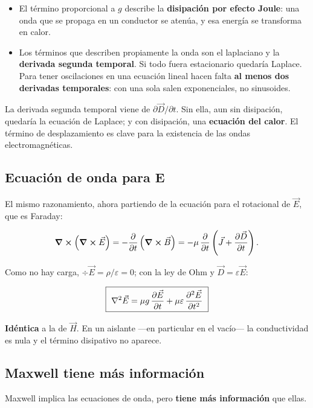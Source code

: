 \documentclass[12pt,a4paper]{article}
\begin{document}
\begin{itemize}
  \item El término proporcional a $g$ describe la \textbf{disipación por efecto Joule}: una
  onda que se propaga en un conductor se atenúa, y esa energía se transforma en
  calor.
  \item Los términos que describen propiamente la onda son el laplaciano y la
  \textbf{derivada segunda temporal}. Si todo fuera estacionario quedaría Laplace.
  Para tener oscilaciones en una ecuación lineal hacen falta \textbf{al menos dos
  derivadas temporales}: con una sola salen exponenciales, no sinusoides.
\end{itemize}

\begin{notebox}
La derivada segunda temporal viene
de $\partial\vec D/\partial t$. Sin ella, aun sin disipación, quedaría la
ecuación de Laplace; y con disipación, una \textbf{ecuación del calor}. El término
de desplazamiento es clave para la existencia de las ondas electromagnéticas.
\end{notebox}

\subsection{Ecuación de onda para E}

El mismo razonamiento, ahora partiendo de la ecuación para el rotacional de
$\vec E$, que es Faraday:

\[
\curl(\curl\vec E) = -\pdv{t}\left(\curl\vec B\right)
= -\mu\,\pdv{t}\left(\vec J + \pdv{\vec D}{t}\right).
\]

Como no hay carga, $\div\vec E = \rho/\varepsilon = 0$; con la ley de Ohm y
$\vec D = \varepsilon\vec E$:

\begin{keybox}
\[
\boxed{\ \laplacian\vec E = \mu g\,\pdv{\vec E}{t} + \mu\varepsilon\,\pdv[2]{\vec E}{t}\ }
\]
\end{keybox}

\textbf{Idéntica} a la de $\vec H$. En un aislante ---en particular en el vacío--- la
conductividad es nula y el término disipativo no aparece.

\subsection{Maxwell tiene más información}

\begin{warnbox}[Ojo]
Maxwell implica las ecuaciones de onda, pero \textbf{tiene más
información} que ellas.
\end{warnbox}
\end{document}
